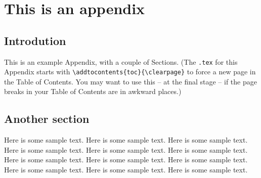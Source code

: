 
\chapter{This is an appendix}

\section{Introdution}

This is an example Appendix, with a couple of Sections. (The
\verb|.tex| for this Appendix starts with
\verb|\addtocontents{toc}{\clearpage}| to force a new page in the Table
of Contents. You may want to use this -- at the final stage -- if the
page breaks in your Table of Contents are in awkward places.)

\section{Another section}

Here is some sample text. Here is some sample text. Here is some sample text.
Here is some sample text. Here is some sample text. Here is some sample text.
Here is some sample text. Here is some sample text. Here is some sample text.
Here is some sample text. Here is some sample text. Here is some sample text.

\endinput
